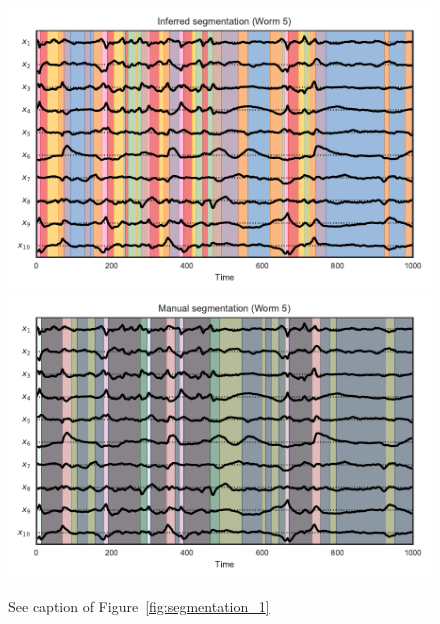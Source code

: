 \documentclass{article}
\begin{document}
\begin{figure}[h]
\centering%
\includegraphics[width=5.5in]{figures/arhmm/x_segmentation_4.pdf}
\includegraphics[width=5.5in]{figures/arhmm/x_segmentation_zimmer_4.pdf}
\caption{See caption of Figure~\ref{fig:segmentation_1}}
\label{fig:segmentation_5}
\end{figure}
\clearpage



\clearpage


\end{document}

